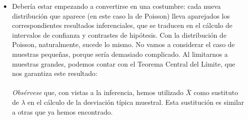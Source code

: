 \begin{itemize}

    \item Debería estar empezando a convertirse en una costumbre: cada nueva distribución que aparece (en este caso la de Poisson) lleva aparejados los correspondientes resultados inferenciales, que se traducen en el cálculo de intervalos de confianza y contrastes de hipótesis. Con la distribución de Poisson, naturalmente, sucede lo mismo. No vamos a considerar el caso de muestras pequeñas, porque sería demasiado complicado. Al limitarnos a muestras grandes, podemos contar con el Teorema Central del Límite, que nos garantiza este resultado:\\[3mm]
       \\[3mm]
       {\em Obsérvese} que, con vistas a la inferencia, hemos utilizado $\bar X$ como sustituto de $\lambda$ en el cálculo de la desviación típica muestral. Esta sustitución es similar a otras que ya hemos encontrado.


\end{itemize}

